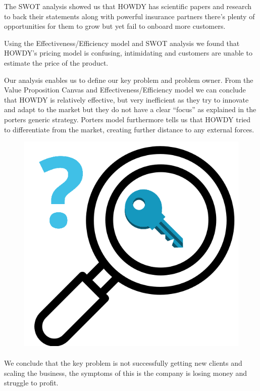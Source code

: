 The SWOT analysis showed us that HOWDY has scientific papers and research to back their statements along with powerful insurance partners there’s plenty of opportunities for them to grow but yet fail to onboard more customers.

Using the Effectiveness/Efficiency model and SWOT analysis we found that HOWDY’s pricing model is confusing, intimidating and customers are unable to estimate the price of the product.

Our analysis enables us to define our key problem and problem owner. From the Value Proposition Canvas and Effectiveness/Efficiency model we can conclude that HOWDY is relatively effective, but very inefficient as they try to innovate and adapt to the market but they do not have a clear “focus” as explained in the porters generic strategy. Porters model furthermore tells us that HOWDY tried to differentiate from the market, creating further distance to any external forces.

\begin{figure}
\centering
\includegraphics[scale=0.15]{figures/keyproblem.png}
\end{figure}
\paragraph{}

We conclude that the key problem is not successfully getting new clients and scaling the business, the symptoms of this is the company is losing money and struggle to profit.

